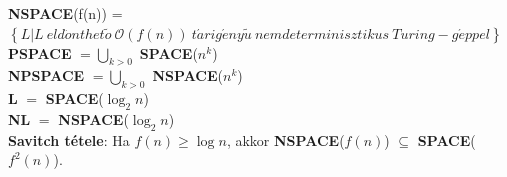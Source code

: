 \documentclass[margin=0px]{article}
\begin{document}
	\noindent \textbf{NSPACE}(f(n)) = $\left\{L|L \ eld\ddot{o}nthet\tilde{o} \ \mathcal{O}(f(n)) \ t\acute{a}rig\acute{e}ny\tilde{u} \
	nemdeterminisztikus \ Turing-g\acute{e}ppel \right\}$\\
	
	\noindent \textbf{PSPACE} $=\bigcup_{k > 0}$ \textbf{SPACE}($n^{k}$)\\
	
	\noindent \textbf{NPSPACE} $=\bigcup_{k > 0}$ \textbf{NSPACE}($n^{k}$)\\
	
	\noindent \textbf{L} $=$ \textbf{SPACE}($\log_{2} n$) \\
	
	\noindent \textbf{NL} $=$ \textbf{NSPACE}($\log_{2} n$) \\
	
	\noindent \textbf{Savitch tétele}: Ha $f(n) \geq \log n$, akkor \textbf{NSPACE}($f(n)$) $\subseteq$ \textbf{SPACE}($f^{2}(n)$).
\end{document}
